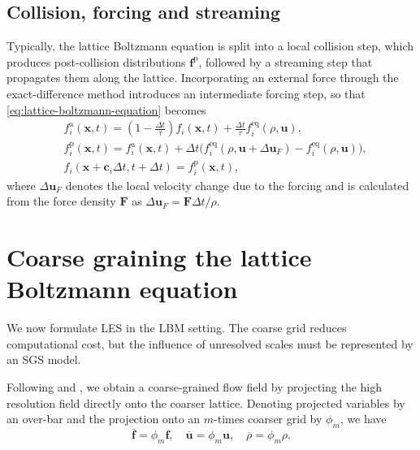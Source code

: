 \documentclass[]{elsarticle}
\begin{document}
\subsection{Collision, forcing and streaming}
Typically, the lattice Boltzmann equation is split into a local collision step, which produces post-collision distributions $\boldsymbol{f}^\text{p}$, followed by a streaming step that propagates them along the lattice. Incorporating an external force through the exact-difference method \cite{kupershtokh_equations_2009} introduces an intermediate forcing step, so that \eqref{eq:lattice-boltzmann-equation} becomes
\begin{align}
    & f_i^{\text{a}}(\boldsymbol{x}, t)=\left(1-\frac{\Delta t}{\tau}\right) f_i(\boldsymbol{x}, t)+ \frac{\Delta t}{\tau} f_i^{\text{eq}}(\rho, \boldsymbol{u}), \\
    &f_i^{\text{p}}(\boldsymbol{x}, t) = f_i^{\text{a}}(\boldsymbol{x}, t)    
    + \Delta t \bigg( f_i^{\text{eq}}(\rho, \boldsymbol{u} + \Delta \boldsymbol{u}_F) - f_i^{\text{eq}}(\rho, \boldsymbol{u})\bigg), \label{eq:collide-and-stream} \\
    & f_i\left(\boldsymbol{x}+\boldsymbol{c}_i \Delta t, t+\Delta t\right)=f_i^{\text{p}}(\boldsymbol{x}, t),
\end{align}
where $\Delta \boldsymbol{u}_F$ denotes the local velocity change due to the forcing and is calculated from the force density $\boldsymbol{F}$ as $\Delta \boldsymbol{u}_F = \boldsymbol{F}\Delta t/\rho$.

\section{Coarse graining the lattice Boltzmann equation}\label{sec:coarse-graining-lattice-boltzmann-equation}
We now formulate LES in the LBM setting. The coarse grid reduces computational cost, but the influence of unresolved scales must be represented by an SGS model.

Following \cite{ortali_kinetic_2025} and \cite{fischer_optimal_2025}, we obtain a coarse-grained flow field by projecting the high resolution field directly onto the coarser lattice. Denoting projected variables by an over-bar and the projection onto an $m$-times coarser grid by $\phi_m$, we have
\begin{equation}
    \overline{\boldsymbol{f}} = \phi_m \boldsymbol{f}, \quad 
    \overline{\boldsymbol{u}} = \phi_m \boldsymbol{u}, \quad
    \overline{\rho} = \phi_m \rho.
\end{equation}
\end{document}
